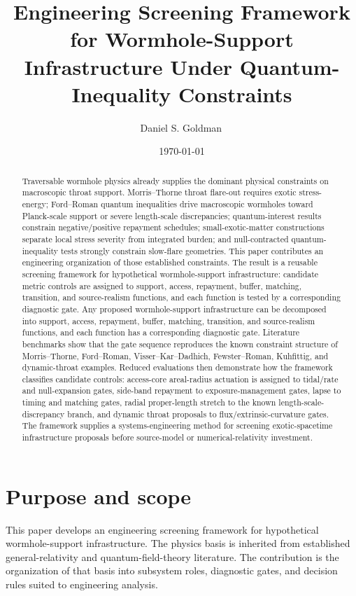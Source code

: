 \documentclass[11pt]{article}
\title{Engineering Screening Framework for Wormhole-Support Infrastructure Under Quantum-Inequality Constraints}
\author[1]{Daniel S. Goldman\,\orcidlink{0000-0003-2835-3521}}
\affil[1]{Independent researcher; ORCID: \href{https://orcid.org/0000-0003-2835-3521}{0000-0003-2835-3521}}
\date{\today}
\begin{document}
\maketitle

\begin{abstract}
Traversable wormhole physics already supplies the dominant physical constraints on macroscopic throat support.  Morris--Thorne throat flare-out requires exotic stress-energy; Ford--Roman quantum inequalities drive macroscopic wormholes toward Planck-scale support or severe length-scale discrepancies; quantum-interest results constrain negative/positive repayment schedules; small-exotic-matter constructions separate local stress severity from integrated burden; and null-contracted quantum-inequality tests strongly constrain slow-flare geometries.  This paper contributes an engineering organization of those established constraints.  The result is a reusable screening framework for hypothetical wormhole-support infrastructure: candidate metric controls are assigned to support, access, repayment, buffer, matching, transition, and source-realism functions, and each function is tested by a corresponding diagnostic gate.  Any proposed wormhole-support infrastructure can be decomposed into support, access, repayment, buffer, matching, transition, and source-realism functions, and each function has a corresponding diagnostic gate.  Literature benchmarks show that the gate sequence reproduces the known constraint structure of Morris--Thorne, Ford--Roman, Visser--Kar--Dadhich, Fewster--Roman, Kuhfittig, and dynamic-throat examples.  Reduced evaluations then demonstrate how the framework classifies candidate controls: access-core areal-radius actuation is assigned to tidal/rate and null-expansion gates, side-band repayment to exposure-management gates, lapse to timing and matching gates, radial proper-length stretch to the known length-scale-discrepancy branch, and dynamic throat proposals to flux/extrinsic-curvature gates.  The framework supplies a systems-engineering method for screening exotic-spacetime infrastructure proposals before source-model or numerical-relativity investment.
\end{abstract}

\section{Purpose and scope}

This paper develops an engineering screening framework for hypothetical wormhole-support infrastructure.  The physics basis is inherited from established general-relativity and quantum-field-theory literature.  The contribution is the organization of that basis into subsystem roles, diagnostic gates, and decision rules suited to engineering analysis.
\end{document}

